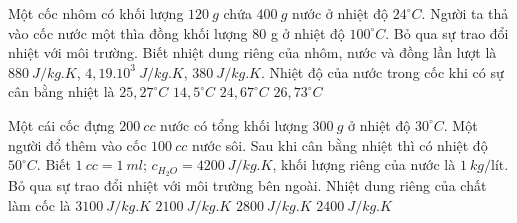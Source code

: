 \begin{ex}%
	Một cốc nhôm có khối lượng $120\ g$ chứa $400\ g$ nước ở nhiệt độ $24^\circ C$. Người ta thả vào cốc nước một thìa đồng khối lượng 80 g ở nhiệt độ $100^\circ C$.  Bỏ qua sự trao đổi nhiệt với môi trường. Biết nhiệt dung riêng của nhôm, nước và đồng lần lượt là $880\ J/kg.K$, $4,19.10^3\ J/kg.K$, $380\ J/kg.K$. Nhiệt độ của nước trong cốc khi có sự cân bằng nhiệt là
	\choice
	{\True $25,27^\circ C$}
	{$14,5^\circ C$}
	{$24,67^\circ C$}
	{$26,73^\circ C$}
	\end{ex}
\begin{ex}%
	Một cái cốc đựng $200\ cc$ nước có tổng khối lượng $300\ g$ ở nhiệt độ $30^{\circ}C$. Một người đổ thêm vào cốc $100\ cc$ nước sôi. Sau khi cân bằng nhiệt thì có nhiệt độ $50^{\circ}C$. Biết $1\ cc=1\ ml$; $c_{H_2O}=4200\ J/kg.K$, khối lượng riêng của nước là $1\ kg/\text{lít}$. Bỏ qua sự trao đổi nhiệt với môi trường bên ngoài. Nhiệt dung riêng của chất làm cốc là
	\choice
	{$3100\ J/kg.K$}
	{\True $2100\ J/kg.K$}
	{$2800\ J/kg.K$}
	{$2400\ J/kg.K$}
	\end{ex}
